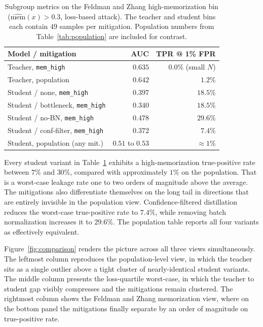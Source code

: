 \documentclass[conference]{IEEEtran}
\begin{document}
\begin{table}[t]
\caption{Subgroup metrics on the Feldman and Zhang high-memorization bin ($\widehat{\mathrm{mem}}(x) > 0.3$, loss-based attack). The teacher and student bins each contain $49$ samples per mitigation. Population numbers from Table~\ref{tab:population} are included for contrast.}
\label{tab:fz}
\centering
\footnotesize
\begin{tabular}{lrr}
\toprule
Model / mitigation & AUC & TPR @ 1\% FPR \\
\midrule
Teacher, \texttt{mem\_high} & $0.635$ & $0.0\%$ (small $N$) \\
Teacher, population & $0.642$ & $1.2\%$ \\
\midrule
Student / none, \texttt{mem\_high} & $0.397$ & $\mathbf{18.5\%}$ \\
Student / bottleneck, \texttt{mem\_high} & $0.340$ & $\mathbf{18.5\%}$ \\
Student / no-BN, \texttt{mem\_high} & $0.478$ & $\mathbf{29.6\%}$ \\
Student / conf-filter, \texttt{mem\_high} & $0.372$ & $\mathbf{7.4\%}$ \\
Student, population (any mit.) & $0.51$ to $0.53$ & $\approx 1\%$ \\
\bottomrule
\end{tabular}
\end{table}

Every student variant in Table~\ref{tab:fz} exhibits a high-memorization true-positive rate between $7\%$ and $30\%$, compared with approximately $1\%$ on the population. That is a worst-case leakage rate one to two orders of magnitude above the average. The mitigations also differentiate themselves on the long tail in directions that are entirely invisible in the population view. Confidence-filtered distillation reduces the worst-case true-positive rate to $7.4\%$, while removing batch normalization increases it to $29.6\%$. The population table reports all four variants as effectively equivalent.

Figure~\ref{fig:comparison} renders the picture across all three views simultaneously. The leftmost column reproduces the population-level view, in which the teacher sits as a single outlier above a tight cluster of nearly-identical student variants. The middle column presents the loss-quartile worst-case, in which the teacher to student gap visibly compresses and the mitigations remain clustered. The rightmost column shows the Feldman and Zhang memorization view, where on the bottom panel the mitigations finally separate by an order of magnitude on true-positive rate.
\end{document}
